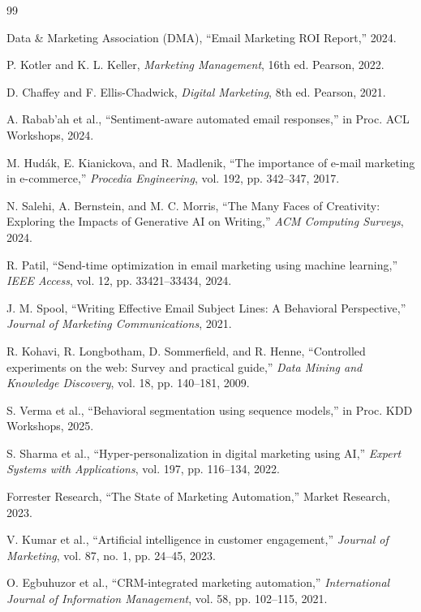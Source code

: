 \documentclass[12pt,journal,compsoc]{IEEEtran}
\begin{document}
\begin{thebibliography}{99}

 Data \& Marketing Association (DMA), ``Email Marketing ROI Report,'' 2024.

 P. Kotler and K. L. Keller, \textit{Marketing Management}, 16th ed. Pearson, 2022.

 D. Chaffey and F. Ellis-Chadwick, \textit{Digital Marketing}, 8th ed. Pearson, 2021.

 A. Rabab'ah et al., ``Sentiment-aware automated email responses,'' in Proc. ACL Workshops, 2024.

 M. Hudák, E. Kianickova, and R. Madlenik, ``The importance of e-mail marketing in e-commerce,'' \textit{Procedia Engineering}, vol. 192, pp. 342--347, 2017.

 N. Salehi, A. Bernstein, and M. C. Morris, ``The Many Faces of Creativity: Exploring the Impacts of Generative AI on Writing,'' \textit{ACM Computing Surveys}, 2024.

 R. Patil, ``Send-time optimization in email marketing using machine learning,'' \textit{IEEE Access}, vol. 12, pp. 33421--33434, 2024.

 J. M. Spool, ``Writing Effective Email Subject Lines: A Behavioral Perspective,'' \textit{Journal of Marketing Communications}, 2021.

 R. Kohavi, R. Longbotham, D. Sommerfield, and R. Henne, ``Controlled experiments on the web: Survey and practical guide,'' \textit{Data Mining and Knowledge Discovery}, vol. 18, pp. 140--181, 2009.

 S. Verma et al., ``Behavioral segmentation using sequence models,'' in Proc. KDD Workshops, 2025.

 S. Sharma et al., ``Hyper-personalization in digital marketing using AI,'' \textit{Expert Systems with Applications}, vol. 197, pp. 116--134, 2022.

 Forrester Research, ``The State of Marketing Automation,'' Market Research, 2023.

 V. Kumar et al., ``Artificial intelligence in customer engagement,'' \textit{Journal of Marketing}, vol. 87, no. 1, pp. 24--45, 2023.

 O. Egbuhuzor et al., ``CRM-integrated marketing automation,'' \textit{International Journal of Information Management}, vol. 58, pp. 102--115, 2021.


\end{thebibliography}
\end{document}
